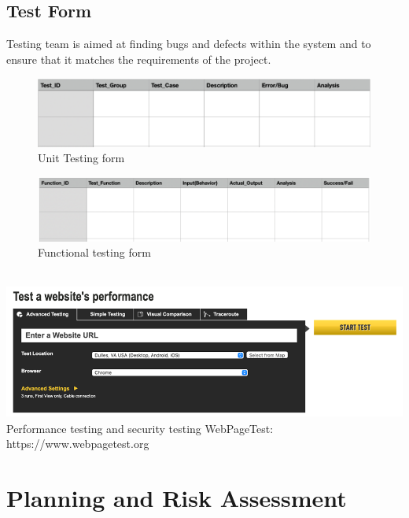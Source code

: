 \documentclass[12pt]{article}
\begin{document}
\subsection{Test Form}
Testing team is aimed at finding bugs and defects within the system and to ensure that it matches the requirements of the project.\\
\begin{figure}[h]
    \centering
    \includegraphics{tf1.png}
    \caption{Unit Testing form}
\end{figure}
\begin{figure}[h]
    \centering
    \includegraphics{tf2.png}
    \caption{Functional testing form}
\end{figure}
\\
\includegraphics[width=1\linewidth]{tf3.png}{\\Performance testing and security testing WebPageTest: https://www.webpagetest.org}

\newpage
\section{Planning and Risk Assessment}
\end{document}
